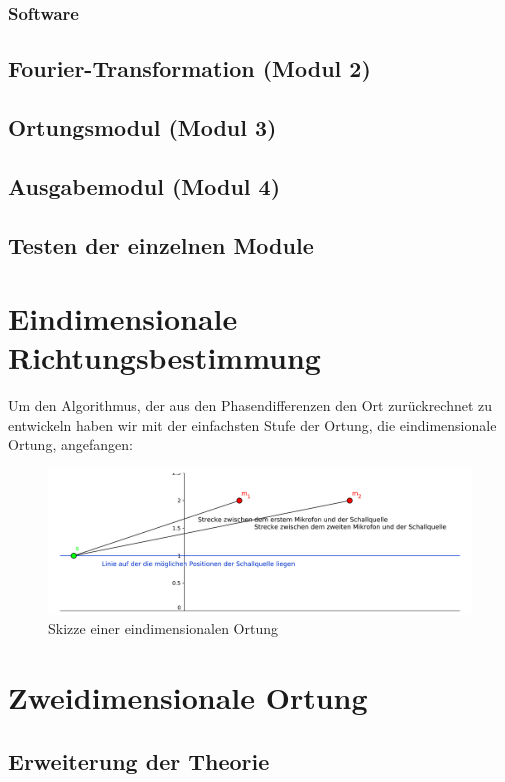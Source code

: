 \documentclass[10pt,a4paper]{article}
\begin{document}
      \subsubsection{Software}
      \subsection{Fourier-Transformation (Modul 2)}
      \subsection{Ortungsmodul (Modul 3)}
      \subsection{Ausgabemodul (Modul 4)}
      \subsection{Testen der einzelnen Module}
  \section{Eindimensionale Richtungsbestimmung} 
  Um den Algorithmus, der aus den Phasendifferenzen den Ort zurückrechnet zu entwickeln haben wir mit der
einfachsten Stufe der Ortung, die eindimensionale Ortung, angefangen:
	\begin{figure}
		\centering
        \includegraphics[width=\linewidth]{skizze1d}
        \caption{Skizze einer eindimensionalen Ortung}
	\end{figure}
  \section{Zweidimensionale Ortung} 
      \subsection{Erweiterung der Theorie}
\end{document}
